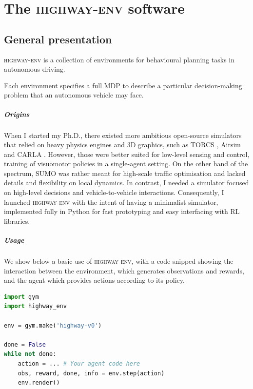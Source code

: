 \graphicspath{{3-Appendices/1-Appendix/}}

\chapter{The \textsc{highway-env} software}

\minitocStartChapterNoNewPage{}

\label{chapter:a}

\section{General presentation}

\textsc{highway-env} is a collection of environments for behavioural planning tasks in autonomous driving.

Each environment specifies a full \gls{MDP} to describe a particular decision-making problem that an autonomous vehicle may face.

\paragraph{Origins}
When I started my Ph.D., there existed more ambitious open-source simulators that relied on heavy physics engines and 3D graphics, such as TORCS \citep{Wymann15torcs:the}, Airsim \citep{shah2017airsim} and CARLA \citep{Dosovitskiy2017}. However, those were better suited for low-level sensing and control, \eg training of visuomotor policies in a single-agent setting. On the other hand of the spectrum, SUMO \citep{SUMO2018} was rather meant for high-scale traffic optimisation and lacked details and flexibility on local dynamics. In contrast, I needed a simulator focused on high-level decisions and vehicle-to-vehicle interactions. Consequently, I launched \textsc{highway-env} with the intent of having a minimalist simulator, implemented fully in Python for fast prototyping and easy interfacing with \gls{RL} libraries.

\paragraph{Usage}
We show below a basic use of \textsc{highway-env}, with a code snipped showing the interaction between the environment, which generates observations and rewards, and the agent which provides actions according to its policy.

\begin{lstlisting}[language=Python,frame=single,caption={Create, step and render the \texttt{highway-v0} environment.},captionpos=b]
import gym
import highway_env

env = gym.make('highway-v0')

done = False
while not done:
    action = ... # Your agent code here
    obs, reward, done, info = env.step(action)
    env.render()
\end{lstlisting}


